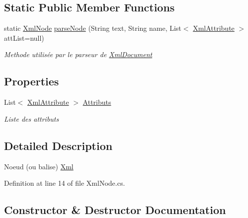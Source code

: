 \subsection*{Static Public Member Functions}
\begin{DoxyCompactItemize}
\item 
static \mbox{\hyperlink{class_n_t_k_1_1_i_o_1_1_xml_1_1_xml_node}{Xml\+Node}} \mbox{\hyperlink{class_n_t_k_1_1_i_o_1_1_xml_1_1_xml_node_a67914d9a3b4c0e29ad165c8bcb551815}{parse\+Node}} (String text, String name, List$<$ \mbox{\hyperlink{class_n_t_k_1_1_i_o_1_1_xml_1_1_xml_attribute}{Xml\+Attribute}} $>$ att\+List=null)
\begin{DoxyCompactList}\small\item\em Methode utilisée par le parseur de \mbox{\hyperlink{class_n_t_k_1_1_i_o_1_1_xml_1_1_xml_document}{Xml\+Document}} \end{DoxyCompactList}\end{DoxyCompactItemize}
\subsection*{Properties}
\begin{DoxyCompactItemize}
\item 
List$<$ \mbox{\hyperlink{class_n_t_k_1_1_i_o_1_1_xml_1_1_xml_attribute}{Xml\+Attribute}} $>$ \mbox{\hyperlink{class_n_t_k_1_1_i_o_1_1_xml_1_1_xml_node_af951236e53f51065bb7208d49bdead90}{Attributs}}
\begin{DoxyCompactList}\small\item\em Liste des attributs \end{DoxyCompactList}\end{DoxyCompactItemize}


\subsection{Detailed Description}
Noeud (ou balise) \mbox{\hyperlink{namespace_n_t_k_1_1_i_o_1_1_xml}{Xml}} 



Definition at line 14 of file Xml\+Node.\+cs.



\subsection{Constructor \& Destructor Documentation}
\mbox{\label{class_n_t_k_1_1_i_o_1_1_xml_1_1_xml_node_ad29487ba5adb4e83915bc08e2f69baf2}} 
